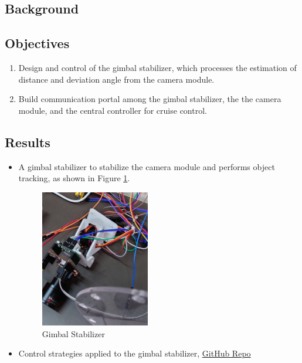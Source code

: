 \documentclass[12pt]{article}
\begin{document}
\subsection{Background}




\subsection{Objectives}

\begin{enumerate}

    \item {Design and control of the gimbal stabilizer, which processes the estimation of distance and deviation angle from the camera module.}
    \item {Build communication portal among the gimbal stabilizer, the the camera module, and the central controller for cruise control.}

\end{enumerate}

\subsection{Results}

\begin{itemize}

    \item {A gimbal stabilizer to stabilize the camera module and performs object tracking, as shown in Figure \ref*{Stabilizer-Control}.}
    \begin{figure}[H]
        \centering
        \includegraphics[width=0.45\textwidth]{portfolio/Gimbal.JPG}
        \caption{Gimbal Stabilizer}
        \label{Stabilizer-Control}
    \end{figure}
    \item {Control strategies applied to the gimbal stabilizer,  \href{https://github.com/Robin0265/StablerCTRL}{GitHub Repo}}
\end{itemize}

\end{document}
